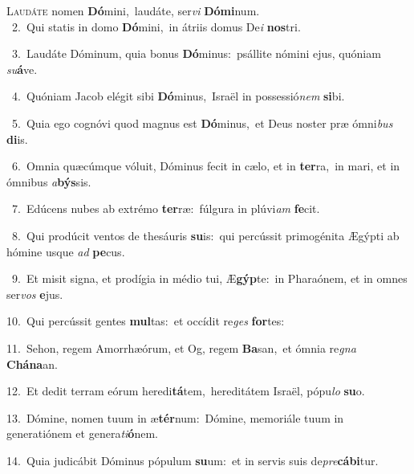 \lettrine{\initial\textcolor{\initialcolor}{L}}{audáte} nomen \textbf{Dó}\-mini,~\star laudáte, ser\textit{vi} \textbf{Dó}\-\textbf{mi}num.\\
{\numbfont\textcolor{\numbcolor}{~2.}}~Qui statis in domo \textbf{Dó}\-mini,~\star in átriis domus De\textit{i} \textbf{nos}\-tri.\par
{\numbfont\textcolor{\numbcolor}{~3.}}~Laudáte Dóminum, quia bonus \textbf{Dó}\-minus:~\star psállite nómini ejus, quóniam \textit{su}\-\textbf{á}ve.\par
{\numbfont\textcolor{\numbcolor}{~4.}}~Quóniam Jacob elégit sibi \textbf{Dó}\-minus,~\star Israël in possessió\textit{nem} \textbf{si}\-bi.\par
{\numbfont\textcolor{\numbcolor}{~5.}}~Quia ego cognóvi quod magnus est \textbf{Dó}\-minus,~\star et Deus noster præ ómni\textit{bus} \textbf{di}\-is.\par
{\numbfont\textcolor{\numbcolor}{~6.}}~Omnia quæcúmque vóluit, Dóminus fecit in cælo, et in \textbf{ter}\-ra,~\star in mari, et in ómnibus \textit{a}\-\textbf{býs}sis.\par
{\numbfont\textcolor{\numbcolor}{~7.}}~Edúcens nubes ab extrémo \textbf{ter}\-ræ:~\star fúlgura in plúvi\textit{am} \textbf{fe}\-cit.\par
{\numbfont\textcolor{\numbcolor}{~8.}}~Qui prodúcit ventos de thesáuris \textbf{su}\-is:~\star qui percússit primogénita Ægýpti ab hómine usque \textit{ad} \textbf{pe}\-cus.\par
{\numbfont\textcolor{\numbcolor}{~9.}}~Et misit signa, et prodígia in médio tui, Æ\-\textbf{gýp}\-te:~\star in Pharaónem, et in omnes ser\textit{vos} \textbf{e}\-jus.\par
{\numbfont\textcolor{\numbcolor}{10.}}~Qui percússit gentes \textbf{mul}\-tas:~\star et occídit re\textit{ges} \textbf{for}\-tes:\par
{\numbfont\textcolor{\numbcolor}{11.}}~Sehon, regem Amorrhæórum, et Og, regem \textbf{Ba}\-san,~\star et ómnia re\textit{gna} \textbf{Chá}\-\textbf{na}an.\par
{\numbfont\textcolor{\numbcolor}{12.}}~Et dedit terram eórum heredi\-\textbf{tá}\-tem,~\star hereditátem Israël, pópu\textit{lo} \textbf{su}\-o.\par
{\numbfont\textcolor{\numbcolor}{13.}}~Dómine, nomen tuum in æ\-\textbf{tér}\-num:~\star Dómine, memoriále tuum in generatiónem et genera\-\textit{ti}\-\textbf{ó}nem.\par
{\numbfont\textcolor{\numbcolor}{14.}}~Quia judicábit Dóminus pópulum \textbf{su}\-um:~\star et in servis suis de\-\textit{pre}\-\textbf{cá}\textbf{bi}tur.\par

